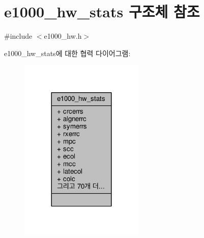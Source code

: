 \hypertarget{structe1000__hw__stats}{}\section{e1000\+\_\+hw\+\_\+stats 구조체 참조}
\label{structe1000__hw__stats}


{\ttfamily \#include $<$e1000\+\_\+hw.\+h$>$}



e1000\+\_\+hw\+\_\+stats에 대한 협력 다이어그램\+:
\nopagebreak
\begin{figure}[H]
\begin{center}
\leavevmode
\includegraphics[width=168pt]{structe1000__hw__stats__coll__graph}
\end{center}
\end{figure}

